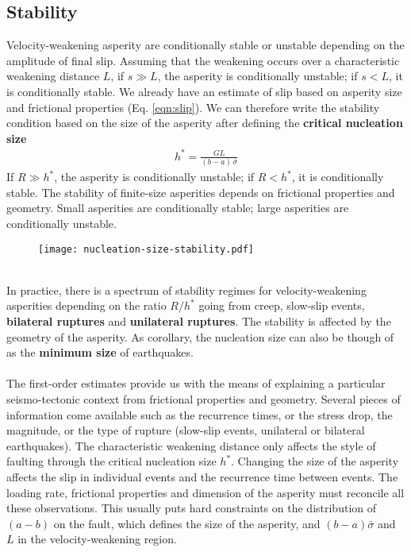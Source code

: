 \documentclass[letterpaper,12pt,]{memoir}
\begin{document}
\subsection{Stability}
Velocity-weakening asperity are conditionally stable or unstable depending on the amplitude of final slip. Assuming that the weakening occurs over a characteristic weakening distance $L$, if $s \gg L$, the asperity is conditionally unstable; if $s < L$, it is conditionally stable. We already have an estimate of slip based on asperity size and frictional properties (Eq. \ref{eqn:slip}). We can therefore write the stability condition based on the size of the asperity after defining the \textbf{critical nucleation size}
\begin{equation}
\boxed{\begin{aligned}
h^*=\frac{GL}{(b-a)\,\bar{\sigma}}
\end{aligned}}
\end{equation}
If $R\gg h^*$, the asperity is conditionally unstable; if $R<h^*$, it is conditionally stable. The stability of finite-size asperities depends on frictional properties and geometry. Small asperities are conditionally stable; large asperities are conditionally unstable.\\
%
\begin{figure}[h]
\begin{center}
\texttt{[image: nucleation-size-stability.pdf]}
\end{center}
\vspace{-0.cm}
\end{figure}
%
\\
In practice, there is a spectrum of stability regimes for velocity-weakening asperities depending on the ratio $R/h^*$ going from creep, slow-slip events, \textbf{bilateral ruptures} and \textbf{unilateral ruptures}. The stability is affected by the geometry of the asperity. As corollary, the nucleation size can also be though of as the \textbf{minimum size} of earthquakes.\\
\\
The first-order estimates provide us with the means of explaining a particular seismo-tectonic context from frictional properties and geometry. Several pieces of information come available such as the recurrence times, or the stress drop, the magnitude, or the type of rupture (slow-slip events, unilateral or bilateral earthquakes). The characteristic weakening distance only affects the style of faulting through the critical nucleation size $h^*$. Changing the size of the asperity affects the slip in individual events and the recurrence time between events. The loading rate, frictional properties and dimension of the asperity must reconcile all these observations. This usually puts hard constraints on the distribution of $(a-b)$ on the fault, which defines the size of the asperity, and $(b-a)\bar{\sigma}$ and $L$ in the velocity-weakening region.
\end{document}
